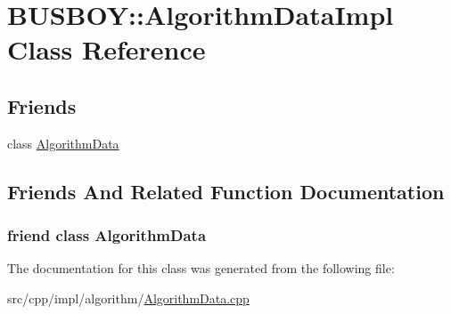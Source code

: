 \hypertarget{classBUSBOY_1_1AlgorithmDataImpl}{
\section{BUSBOY::AlgorithmDataImpl Class Reference}
\label{classBUSBOY_1_1AlgorithmDataImpl}
}
\subsection*{Friends}
\begin{DoxyCompactItemize}
\item 
class \hyperlink{classBUSBOY_1_1AlgorithmDataImpl_a1781091e58265b7dc60b43f790c5d1a4}{AlgorithmData}
\end{DoxyCompactItemize}


\subsection{Friends And Related Function Documentation}
\hypertarget{classBUSBOY_1_1AlgorithmDataImpl_a1781091e58265b7dc60b43f790c5d1a4}{
\subsubsection[{AlgorithmData}]{\setlength{\rightskip}{0pt plus 5cm}friend class {\bf AlgorithmData}}}
\label{classBUSBOY_1_1AlgorithmDataImpl_a1781091e58265b7dc60b43f790c5d1a4}


The documentation for this class was generated from the following file:\begin{DoxyCompactItemize}
\item 
src/cpp/impl/algorithm/\hyperlink{AlgorithmData_8cpp}{AlgorithmData.cpp}\end{DoxyCompactItemize}
